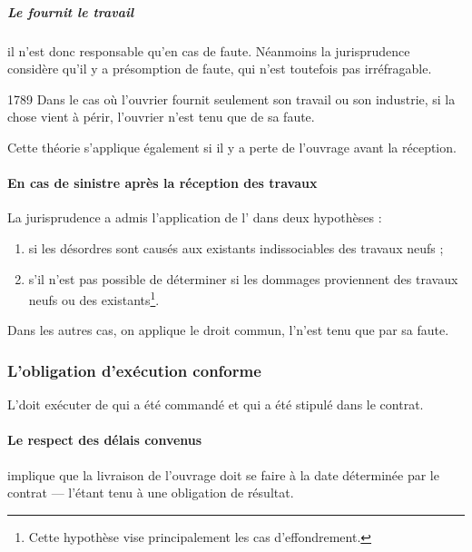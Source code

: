 				\subparagraph{Le \lo fournit le travail} il n'est donc responsable qu'en cas de faute. Néanmoins la jurisprudence considère qu'il y a présomption de faute, qui n'est toutefois pas irréfragable.
				
				\begin{citationArticleCciv}{1789}
					Dans le cas où l'ouvrier fournit seulement son travail ou son industrie, si la chose vient à périr, l'ouvrier n'est tenu que de sa faute.
				\end{citationArticleCciv}
			
				Cette théorie s'applique également si il y a perte de l'ouvrage avant la réception.
				
				\paragraph{En cas de sinistre après la réception des travaux} La jurisprudence a admis l'application de l' dans deux hypothèses :
				\begin{enumerate}
					\item si les désordres sont causés aux existants indissociables des travaux neufs ;
					
					\item s'il n'est pas possible de déterminer si les dommages proviennent des travaux neufs ou des existants\footnote{Cette hypothèse vise principalement les cas d'effondrement.}.
				\end{enumerate}
				
				Dans les autres cas, on applique le droit commun, l'\E n'est tenu que par sa faute.
			
			\subsubsection{L'obligation d'exécution conforme}
			
				L'\E doit exécuter de qui a été commandé et qui a été stipulé dans le contrat.
			
				\paragraph{Le respect des délais convenus} implique que la livraison de l'ouvrage doit se faire à la date déterminée par le contrat --- l'\E étant tenu à une obligation de résultat.
				

